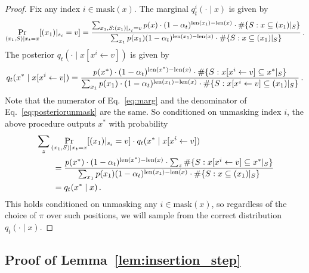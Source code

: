 \begin{proof}
    Fix any index $i \in \mathrm{mask}(x)$. The marginal $q^i_t(\cdot\mid x)$ is given by
    \begin{equation}
    \Pr_{(x_1,S)\mid x_t=x}[(x_1)|_{s_i} = v] = \frac{\sum_{x_1, S: (x_1)|_{s_i} = v} p(x) \cdot (1 - \alpha_t)^{\mathrm{len}(x_1) - \mathrm{len}(x)}\cdot \#\{S: x\subseteq (x_1)|_S\}}{\sum_{x_1} p(x_1) (1 - \alpha_t)^{\mathrm{len}(x_1) - \mathrm{len}(x)} \cdot \#\{S: x\subseteq (x_1)|_S\}}\,. \label{eq:marg}
    \end{equation}
    The posterior $q_t(\cdot \mid x[x^i\gets v])$ is given by
    \begin{equation}
        q_t(x^*\mid x[x^i\leftarrow v]) = \frac{p(x^*) \cdot (1 - \alpha_t)^{\mathrm{len}(x^*) - \mathrm{len}(x)}\cdot \#\{S: x[x^i\leftarrow v]\subseteq x^*|_S\}}{\sum_{x_1} p(x_1) \cdot (1 - \alpha_t)^{\mathrm{len}(x_1) - \mathrm{len}(x)}\cdot \#\{S: x[x^i\leftarrow v]\subseteq (x_1)|_S\}}\,. \label{eq:posteriorunmask}
    \end{equation}
    Note that the numerator of Eq.~\eqref{eq:marg} and the denominator of Eq.~\eqref{eq:posteriorunmask} are the same. So conditioned on unmasking index $i$, the above procedure outputs $x^*$ with probability
    \begin{align*}
        \MoveEqLeft \sum_z \Pr_{(x_1,S)\mid x_t = x}[(x_1)|_{s_i} = v]\cdot q_t(x^* \mid x[x^i\leftarrow v]) \\
        &= \frac{p(x^*) \cdot (1 - \alpha_t)^{\length{x^*} - \length{x}} \cdot \sum_z \#\{S: x[x^i\gets v]\subseteq x^*|_S\}}{\sum_{x_1} p(x_1) (1 - \alpha_t)^{\length{x_1} - \length{x}} \cdot \#\{S: x\subseteq (x_1)|_S\}} \\
        &= q_t(x^*\mid x)\,.
    \end{align*}
    This holds conditioned on unmasking any $i \in\mathrm{mask}(x)$, so regardless of the choice of $\pi$ over such positions, we will sample from the correct distribution $q_t(\cdot\mid x)$.
\end{proof}


\subsection{Proof of Lemma~\ref{lem:insertion_step}}
\label{sec:insertion_step}

